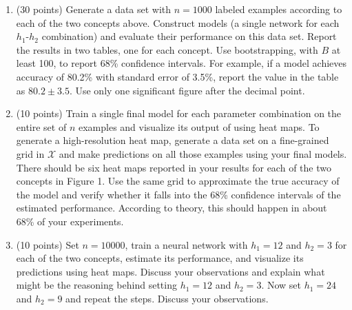 \documentclass[twoside]{article}
\begin{document}
\begin{enumerate}
\item (30 points) Generate a data set with $n=1000$ labeled examples according to each of the two concepts above. Construct models (a single network for each $h_1$-$h_2$ combination) and evaluate their performance on this data set. Report the results in two tables, one for each concept. Use bootstrapping, with $B$ at least 100, to report 68\% confidence intervals. For example, if a model achieves accuracy of 80.2\% with standard error of 3.5\%, report the value in the table as $80.2\pm 3.5$. Use only one significant figure after the decimal point.
\item (10 points) Train a single final model for each parameter combination on the entire set of $n$ examples and visualize its output of using heat maps. To generate a high-resolution heat map, generate a data set on a fine-grained grid in $\mathcal{X}$ and make predictions on all those examples using your final models. There should be six heat maps reported in your results for each of the two concepts in Figure 1. Use the same grid to approximate the true accuracy of the model and verify whether it falls into the 68\% confidence intervals of the estimated performance. According to theory, this should happen in about 68\% of your experiments.
\item (10 points) Set $n=10000$, train a neural network with $h_1=12$ and $h_2=3$ for each of the two concepts, estimate its performance, and visualize its predictions using heat maps. Discuss your observations and explain what might be the reasoning behind setting $h_1=12$ and $h_2=3$. Now set $h_1=24$ and $h_2=9$ and repeat the steps. Discuss your observations.
\end{enumerate}
\end{document}
